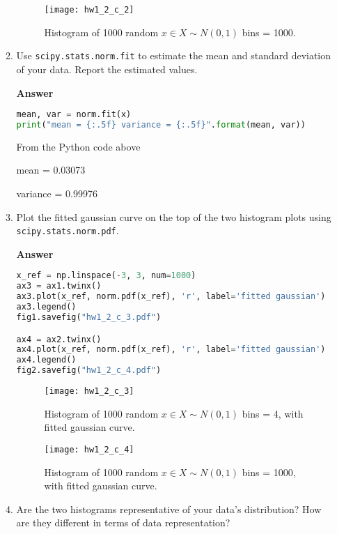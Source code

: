 \documentclass[11pt]{article}
\begin{document}
\begin{enumerate}[label=(\alph*)]
\begin{enumerate}[label=(\roman*)]
\begin{figure}[H]
\centering
\texttt{[image: hw1\_2\_c\_2]}
\caption{Histogram of 1000 random $x \in X \sim N(0,1)$ bins = 1000.}
\label{fig: figure}
\end{figure}

\item Use \texttt{scipy.stats.norm.fit} to estimate the mean and standard deviation of your data. Report the estimated values.

\noindent\textbf{Answer}

\begin{lstlisting}[language=Python, showstringspaces=false]
mean, var = norm.fit(x)
print("mean = {:.5f} variance = {:.5f}".format(mean, var))
\end{lstlisting}

From the Python code above

mean = 0.03073

variance = 0.99976

\item Plot the fitted gaussian curve on the top of the two histogram plots using \texttt{scipy.stats.norm.pdf}.

\noindent\textbf{Answer}

\begin{lstlisting}[language=Python, showstringspaces=false]
x_ref = np.linspace(-3, 3, num=1000)
ax3 = ax1.twinx()
ax3.plot(x_ref, norm.pdf(x_ref), 'r', label='fitted gaussian')
ax3.legend()
fig1.savefig("hw1_2_c_3.pdf")

ax4 = ax2.twinx()
ax4.plot(x_ref, norm.pdf(x_ref), 'r', label='fitted gaussian')
ax4.legend()
fig2.savefig("hw1_2_c_4.pdf")
\end{lstlisting}

\begin{figure}[H]
\centering
\texttt{[image: hw1\_2\_c\_3]}
\caption{Histogram of 1000 random $x \in X \sim N(0,1)$ bins = 4, with fitted gaussian curve. }
\label{fig: figure}
\end{figure}

\begin{figure}[H]
\centering
\texttt{[image: hw1\_2\_c\_4]}
\caption{Histogram of 1000 random $x \in X \sim N(0,1)$ bins = 1000, with fitted gaussian curve.}
\label{fig: figure}
\end{figure}

\item Are the two histograms representative of your data's distribution? How are they different in terms of data representation?


\end{enumerate}
\end{enumerate}
\end{document}
